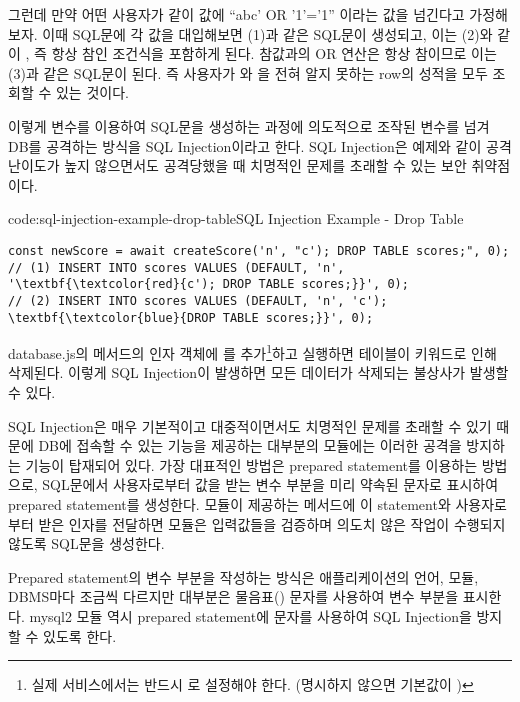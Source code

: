 그런데 만약 어떤 사용자가 \과 같이  값에 ``abc' OR '1'='1'' 이라는 값을 넘긴다고 가정해보자. 이때 SQL문에 각 값을 대입해보면 (1)과 같은 SQL문이 생성되고, 이는 (2)와 같이 , 즉 항상 참인 조건식을 포함하게 된다. 참값과의 OR 연산은 항상 참이므로 이는 (3)과 같은 SQL문이 된다. 즉 사용자가 와 을 전혀 알지 못하는 row의 성적을 모두 조회할 수 있는 것이다.

이렇게 변수를 이용하여 SQL문을 생성하는 과정에 의도적으로 조작된 변수를 넘겨 DB를 공격하는 방식을 SQL Injection이라고 한다. SQL Injection은 예제와 같이 공격 난이도가 높지 않으면서도 공격당했을 때 치명적인 문제를 초래할 수 있는 보안 취약점이다.

\begin{codeenv}{code:sql-injection-example-drop-table}{SQL Injection Example - Drop Table}
\begin{Verbatim}[commandchars=\\\{\}]
const newScore = await createScore('n', "c'); DROP TABLE scores;", 0);
// (1) INSERT INTO scores VALUES (DEFAULT, 'n', '\textbf{\textcolor{red}{c'); DROP TABLE scores;}}', 0);
// (2) INSERT INTO scores VALUES (DEFAULT, 'n', 'c'); \textbf{\textcolor{blue}{DROP TABLE scores;}}', 0);
\end{Verbatim}
\end{codeenv}

database.js의  메서드의 인자 객체에 를 추가\footnote{실제 서비스에서는 반드시 로 설정해야 한다. (명시하지 않으면 기본값이 )}하고 \을 실행하면  테이블이  키워드로 인해 삭제된다. 이렇게 SQL Injection이 발생하면 모든 데이터가 삭제되는 불상사가 발생할 수 있다.

SQL Injection은 매우 기본적이고 대중적이면서도 치명적인 문제를 초래할 수 있기 때문에 DB에 접속할 수 있는 기능을 제공하는 대부분의 모듈에는 이러한 공격을 방지하는 기능이 탑재되어 있다. 가장 대표적인 방법은 prepared statement를 이용하는 방법으로, SQL문에서 사용자로부터 값을 받는 변수 부분을 미리 약속된 문자로 표시하여 prepared statement를 생성한다. 모듈이 제공하는 메서드에 이 statement와 사용자로부터 받은 인자를 전달하면 모듈은 입력값들을 검증하며 의도치 않은 작업이 수행되지 않도록 SQL문을 생성한다.

Prepared statement의 변수 부분을 작성하는 방식은 애플리케이션의 언어, 모듈, DBMS마다 조금씩 다르지만 대부분은 물음표() 문자를 사용하여 변수 부분을 표시한다. mysql2 모듈 역시 prepared statement에  문자를 사용하여 SQL Injection을 방지할 수 있도록 한다.

